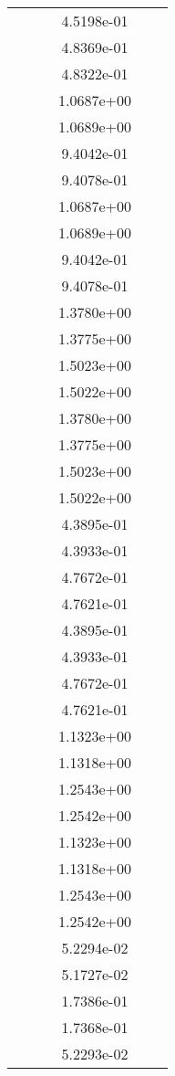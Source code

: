 \begin{xltabular}{\textwidth}{r|rS[table-format=1.3e+2]S[table-format=1.4e+2]S[table-format=1.4e+2]S[table-format=-1.5]}
&  &  & 4.5198e-01 & & \\
&  &  & 4.8369e-01 & & \\
&  &  & 4.8322e-01 & & \\
&  &  & 1.0687e+00 & & \\
&  &  & 1.0689e+00 & & \\
&  &  & 9.4042e-01 & & \\
&  &  & 9.4078e-01 & & \\
&  &  & 1.0687e+00 & & \\
&  &  & 1.0689e+00 & & \\
&  &  & 9.4042e-01 & & \\
&  &  & 9.4078e-01 & & \\
&  &  & 1.3780e+00 & & \\
&  &  & 1.3775e+00 & & \\
&  &  & 1.5023e+00 & & \\
&  &  & 1.5022e+00 & & \\
&  &  & 1.3780e+00 & & \\
&  &  & 1.3775e+00 & & \\
&  &  & 1.5023e+00 & & \\
&  &  & 1.5022e+00 & & \\
&  &  & 4.3895e-01 & & \\
&  &  & 4.3933e-01 & & \\
&  &  & 4.7672e-01 & & \\
&  &  & 4.7621e-01 & & \\
&  &  & 4.3895e-01 & & \\
&  &  & 4.3933e-01 & & \\
&  &  & 4.7672e-01 & & \\
&  &  & 4.7621e-01 & & \\
&  &  & 1.1323e+00 & & \\
&  &  & 1.1318e+00 & & \\
&  &  & 1.2543e+00 & & \\
&  &  & 1.2542e+00 & & \\
&  &  & 1.1323e+00 & & \\
&  &  & 1.1318e+00 & & \\
&  &  & 1.2543e+00 & & \\
&  &  & 1.2542e+00 & & \\
&  &  & 5.2294e-02 & & \\
&  &  & 5.1727e-02 & & \\
&  &  & 1.7386e-01 & & \\
&  &  & 1.7368e-01 & & \\
&  &  & 5.2293e-02 & & \\

\end{xltabular}
